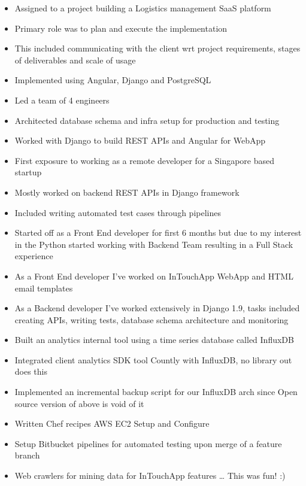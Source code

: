 \documentclass[10pt,a4paper]{altacv}
\begin{document}
\begin{itemize}
\item Assigned to a project building a Logistics management SaaS platform
\item Primary role was to plan and execute the implementation
\item This included communicating with the client wrt project requirements, stages of deliverables and scale of usage
\item Implemented using Angular, Django and PostgreSQL
\item Led a team of 4 engineers
\item Architected database schema and infra setup for production and testing
\item Worked with Django to build REST APIs and Angular for WebApp
\end{itemize}

\divider\smallskip

\begin{itemize}
\item First exposure to working as a remote developer for a Singapore based startup
\item Mostly worked on backend REST APIs in Django framework
\item Included writing automated test cases through pipelines
\end{itemize}

\newpage

\begin{itemize}
\item Started off as a Front End developer for first 6 months but due to my interest in the
Python started working with Backend Team resulting in a Full Stack experience
\item As a Front End developer I’ve worked on InTouchApp WebApp and HTML email templates
\item As a Backend developer I’ve worked extensively in Django 1.9, tasks included
creating APIs, writing tests, database schema architecture and monitoring
\item Built an analytics internal tool using a time series database called InfluxDB
\item Integrated client analytics SDK tool Countly with InfluxDB, no library out does this
\item Implemented an incremental backup script for our InfluxDB arch since
Open source version of above is void of it
\item Written Chef recipes AWS EC2 Setup and Configure
\item Setup Bitbucket pipelines for automated testing upon merge of a feature branch
\item Web crawlers for mining data for InTouchApp features … This was fun! :)
\end{itemize}
\end{document}
